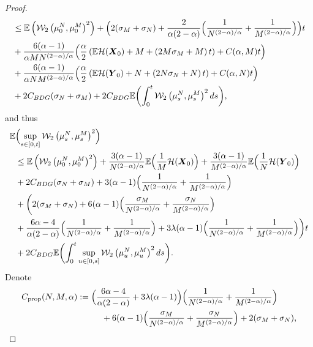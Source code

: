\documentclass[JEP,XML,SOM,Unicode,published]{cedram}
\newcommand{\bX}{{\boldsymbol{X}}}
\newcommand{\bY}{{\boldsymbol{Y}}}
\theoremstyle{plain}
\theoremstyle{definition}
\begin{document}
\begin{proof}
\begin{align*}
&\leq \mathbb{E}\left(\mathcal{W}_2\left(\mu_0^N,\mu_0^M\right)^2\right)+\Bigl(2(\sigma_M+\sigma_N)+\frac{2}{\alpha(2-\alpha)}\Bigl(\frac{1}{N^{(2-\alpha)/\alpha}}+\frac{1}{M^{(2-\alpha)/\alpha}}\Bigr)\Bigr)t\\
&+\frac{6(\alpha-1)}{\alpha MN^{(2-\alpha)/\alpha}}\Bigl(\frac{\alpha}{2}\left(\mathbb{E}\mathcal{H}(\bX_0)+M+\left(2M\sigma_M+M\right)t\right)+C(\alpha,M)t\Bigr)\\
&+\frac{6(\alpha-1)}{\alpha NM^{(2-\alpha)/\alpha}}\Bigl(\frac{\alpha}{2}\left(\mathbb{E}\mathcal{H}(\bY_0)+N+\left(2N\sigma_N+N\right)t\right)+C(\alpha,N)t\Bigr)\\
&+2C_{BDG}(\sigma_N+\sigma_M)+2C_{BDG}\mathbb{E}\biggl(\int_0^t\mathcal{W}_2\left(\mu_s^N,\mu_s^M\right)^2ds\biggr),
\end{align*}
and thus\vspace*{-3pt}
\begin{align*}
\mathbb{E}&\Bigl(\sup_{s\in[0,t]}\mathcal{W}_2\left(\mu_s^N,\mu_s^M\right)^2\Bigr)\\
&\leq \mathbb{E}\left(\mathcal{W}_2\left(\mu_0^N,\mu_0^M\right)^2\right)+\frac{3(\alpha-1)}{ N^{(2-\alpha)/\alpha}}\mathbb{E}\Bigl(\frac{1}{M}\mathcal{H}(\bX_0)\Bigr)+\frac{3(\alpha-1)}{M^{(2-\alpha)/\alpha}}\mathbb{E}\Bigl(\frac{1}{N}\mathcal{H}(\bY_0)\Bigr)\\
&+2C_{BDG}(\sigma_N+\sigma_M)+3(\alpha-1)\Bigl(\frac{1}{N^{(2-\alpha)/\alpha}}+\frac{1}{M^{(2-\alpha)/\alpha}}\Bigr)\\
&+\biggl(2(\sigma_M+\sigma_N)+6(\alpha-1)\Bigl(\frac{\sigma_M}{N^{(2-\alpha)/\alpha}}+\frac{\sigma_N}{M^{(2-\alpha)/\alpha}}\Bigr)\\
&+\frac{6\alpha-4}{\alpha(2-\alpha)}\Bigl(\frac{1}{N^{(2-\alpha)/\alpha}}+\frac{1}{M^{(2-\alpha)/\alpha}}\Bigr)+3\lambda(\alpha-1)\Bigl(\frac{1}{N^{(2-\alpha)/\alpha}}+\frac{1}{M^{(2-\alpha)/\alpha}}\Bigr)\biggr)t\\
&+2C_{BDG}\mathbb{E}\biggl(\int_0^t\sup_{u\in[0,s]}\mathcal{W}_2\left(\mu_u^N,\mu_u^M\right)^2ds\biggr).
\end{align*}
Denote
\begin{align*}
C_{\text{prop}}(N,M,\alpha)&:=\Bigl(\frac{6\alpha-4}{\alpha(2-\alpha)}+3\lambda(\alpha-1)\Bigr)\Bigl(\frac{1}{N^{(2-\alpha)/\alpha}}+\frac{1}{M^{(2-\alpha)/\alpha}}\Bigr)\\
&\hspace*{1cm}+6(\alpha-1)\Bigl(\frac{\sigma_M}{N^{(2-\alpha)/\alpha}}+\frac{\sigma_N}{M^{(2-\alpha)/\alpha}}\Bigr)+2(\sigma_M+\sigma_N),\\

\end{align*}
\end{proof}
\end{document}
